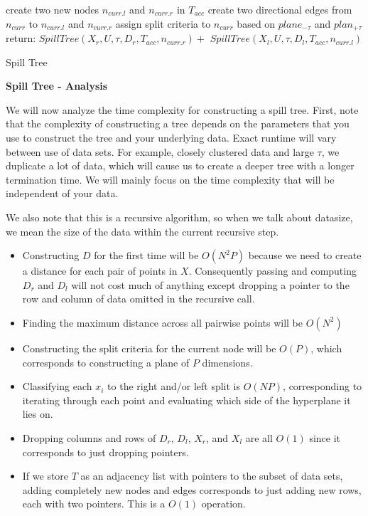 \begin{algorithm}[ht!]
{{{            
        }
        create two new nodes $n_{curr.l}$ and $n_{curr.r}$ in $T_{acc}$ \;
        create two directional edges from $n_{curr}$ to $n_{curr.l}$ and $n_{curr.r}$ \;
        assign split criteria to $n_{curr}$ based on $plane_{-\tau}$ and $plan_{+\tau}$
        return: $SpillTree(X_{r}, U, \tau, D_{r}, T_{acc}, n_{curr.r}) + $\; 
        \hspace{10pt} $SpillTree(X_{l}, U, \tau, D_{l}, T_{acc}, n_{curr.l})$
    }
}
\caption{Spill Tree\label{ST1}}
\end{algorithm}

\vspace{5 mm}
\noindent
\textbf{Spill Tree - Analysis}

\vspace{5 mm}
\noindent
We will now analyze the time complexity for constructing a spill tree. First, 
note that the complexity of constructing a tree depends on the parameters that 
you use to construct the tree and your underlying data. Exact runtime will 
vary between use of data sets. For example, closely clustered data and large 
$\tau$, we duplicate a lot of data, which will cause us to create a deeper tree 
with a longer termination time. We will mainly focus on the time complexity 
that will be independent of your data.

\vspace{5 mm}
\noindent
We also note that this is a recursive algorithm, so when we talk about 
datasize, we mean the size of the data within the current recursive step.

\begin{itemize}
\item Constructing $D$ for the first time will be $O(N^{2} P)$ because we need 
to create a distance for each pair of points in $X$. Consequently passing and 
computing $D_{r}$ and $D_{l}$ will not cost much of anything except dropping a 
pointer to the row and column of data omitted in the recursive call.
\item Finding the maximum distance across all pairwise points will be 
$O(N^{2})$
\item Constructing the split criteria for the current node will be $O(P)$, 
which corresponds to constructing a plane of $P$ dimensions.
\item Classifying each $x_{i}$ to the right and/or left split is $O(N P)$, 
corresponding to iterating through each point and evaluating which side of the 
hyperplane it lies on.
\item Dropping columns and rows of $D_{r}$, $D_{l}$, $X_{r}$, and $X_{l}$ are 
all $O(1)$ since it corresponds to just dropping pointers.
\item If we store $T$ as an adjacency list with pointers to the subset of data 
sets, adding completely new nodes and edges corresponds to just adding new rows, 
each with two pointers. This is a $O(1)$ operation.
\end{itemize}


